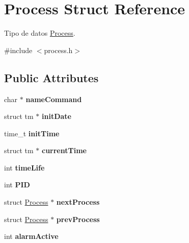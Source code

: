 \hypertarget{structProcess}{\section{Process Struct Reference}
\label{structProcess}
}


Tipo de datos \hyperlink{structProcess}{Process}.  




{\ttfamily \#include $<$process.\-h$>$}

\subsection*{Public Attributes}
\begin{DoxyCompactItemize}
\item 
\hypertarget{structProcess_a662ca240ef1dacacabcd924fd9af82e7}{char $\ast$ {\bfseries name\-Command}}\label{structProcess_a662ca240ef1dacacabcd924fd9af82e7}

\item 
\hypertarget{structProcess_aff4cd045be6418992ad4e7da3786311e}{struct tm $\ast$ {\bfseries init\-Date}}\label{structProcess_aff4cd045be6418992ad4e7da3786311e}

\item 
\hypertarget{structProcess_a5ab8b03c3814a5c6375db2c1a7355d67}{time\-\_\-t {\bfseries init\-Time}}\label{structProcess_a5ab8b03c3814a5c6375db2c1a7355d67}

\item 
\hypertarget{structProcess_a0e2cceda086db9056e9b3aebf39b7c4e}{struct tm $\ast$ {\bfseries current\-Time}}\label{structProcess_a0e2cceda086db9056e9b3aebf39b7c4e}

\item 
\hypertarget{structProcess_a68ae4843fe710d656e966384616fe058}{int {\bfseries time\-Life}}\label{structProcess_a68ae4843fe710d656e966384616fe058}

\item 
\hypertarget{structProcess_adb0c46143370e496529399c088cc22c8}{int {\bfseries P\-I\-D}}\label{structProcess_adb0c46143370e496529399c088cc22c8}

\item 
\hypertarget{structProcess_aa6b33e5fef829435484138d3ae01f8f4}{struct \hyperlink{structProcess}{Process} $\ast$ {\bfseries next\-Process}}\label{structProcess_aa6b33e5fef829435484138d3ae01f8f4}

\item 
\hypertarget{structProcess_ad04a534cb93811967dfa2911e4813c30}{struct \hyperlink{structProcess}{Process} $\ast$ {\bfseries prev\-Process}}\label{structProcess_ad04a534cb93811967dfa2911e4813c30}

\item 
\hypertarget{structProcess_afbab796c0c17262b31cb783477e9ad1d}{int {\bfseries alarm\-Active}}\label{structProcess_afbab796c0c17262b31cb783477e9ad1d}

\end{DoxyCompactItemize}


